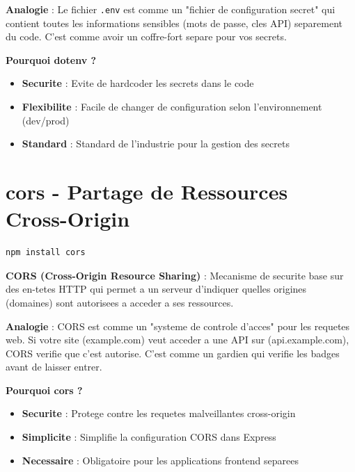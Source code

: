 \documentclass[a4paper,12pt]{book}
\begin{document}
\begin{analogybox}
    \textbf{Analogie} : Le fichier \texttt{.env} est comme un "fichier de configuration secret" qui contient toutes les informations sensibles (mots de passe, cles API) separement du code. C'est comme avoir un coffre-fort separe pour vos secrets.
\end{analogybox}

\textbf{Pourquoi dotenv ?}
\begin{itemize}
    \item \textbf{Securite} : Evite de hardcoder les secrets dans le code
    \item \textbf{Flexibilite} : Facile de changer de configuration selon l'environnement (dev/prod)
    \item \textbf{Standard} : Standard de l'industrie pour la gestion des secrets
\end{itemize}

\section{cors - Partage de Ressources Cross-Origin}

\begin{lstlisting}[style=bash, caption=Installation de cors]
npm install cors
\end{lstlisting}

\begin{definitionbox}
    \textbf{CORS (Cross-Origin Resource Sharing)} : Mecanisme de securite base sur des en-tetes HTTP qui permet a un serveur d'indiquer quelles origines (domaines) sont autorisees a acceder a ses ressources.
\end{definitionbox}

\begin{analogybox}
    \textbf{Analogie} : CORS est comme un "systeme de controle d'acces" pour les requetes web. Si votre site (example.com) veut acceder a une API sur (api.example.com), CORS verifie que c'est autorise. C'est comme un gardien qui verifie les badges avant de laisser entrer.
\end{analogybox}

\textbf{Pourquoi cors ?}
\begin{itemize}
    \item \textbf{Securite} : Protege contre les requetes malveillantes cross-origin
    \item \textbf{Simplicite} : Simplifie la configuration CORS dans Express
    \item \textbf{Necessaire} : Obligatoire pour les applications frontend separees
\end{itemize}
\end{document}

